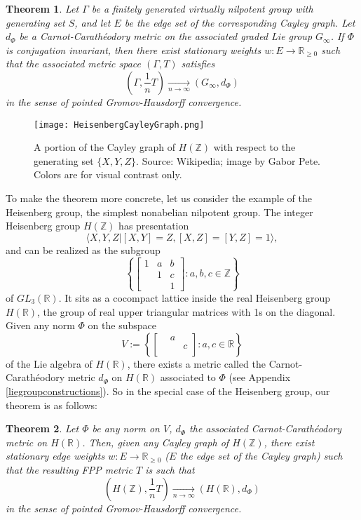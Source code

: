 \documentclass[12pt,reqno]{article}
\numberwithin{equation}{section}
\newcommand{\R}{\mathbb{R}}
\newcommand{\Z}{\mathbb{Z}}
\newcommand{\tendsto}[2]{\xrightarrow[#1 \to #2]{}}
\newtheorem{thm}{Theorem}
\begin{document}
\begin{thm} \label{mainthm}
Let $\Gamma$ be a finitely generated virtually nilpotent group with generating set $S$, and let $E$ be the edge set of the
corresponding Cayley graph. Let $d_{\Phi}$ be a Carnot-Carath\'eodory
metric on the associated graded Lie group $G_{\infty}$. If $\Phi$ is conjugation invariant, then there exist stationary weights
$w:E \to \R_{\ge 0}$ such that the associated metric space $(\Gamma, T)$ satisfies
\[ \left (\Gamma, \frac{1}{n}T \right) \tendsto{n}{\infty} (G_{\infty}, d_{\Phi}) \]
in the sense of pointed Gromov-Hausdorff convergence.
\end{thm}


\begin{figure}[t]
   \centering
   \texttt{[image: HeisenbergCayleyGraph.png]}
   \caption{A portion of the Cayley graph of $H(\Z)$ with respect to the generating set $\{X,Y,Z\}$. Source: Wikipedia; image by Gabor Pete.
   Colors are for visual contrast only.}
\end{figure}

 To make the theorem more concrete, let us consider the example of the Heisenberg group, the simplest nonabelian nilpotent group.
 The integer Heisenberg group $H(\Z)$ has presentation
 \[ \langle X, Y, Z | [X,Y]=Z, [X,Z]=[Y,Z]=1 \rangle, \]
 and can be realized as the subgroup
 \[ \left\{
    \begin{bmatrix}
    1 & a & b \\
       & 1 & c \\
       &    & 1
    \end{bmatrix}
    : a,b,c \in \Z 
    \right\}
 \]
 of $GL_3(\R)$. It sits as a cocompact lattice inside the real Heisenberg group $H(\R)$, the group of real upper triangular matrices
 with 1s on the diagonal. Given any norm $\Phi$ on the subspace
 \[ V := \left\{
    \begin{bmatrix}
      & a &   \\
      &    & c \\
      &    &
    \end{bmatrix}
    :
    a,c \in \R
    \right\}
 \]
 of the Lie algebra of $H(\R)$, there exists a metric called the Carnot-Carath\'eodory metric $d_{\Phi}$ on $H(\R)$ associated to $\Phi$
 (see Appendix \ref{liegroupconstructions}). So in the special case of the Heisenberg group, our theorem is as follows:
 \begin{thm}
 Let $\Phi$ be any norm on $V$, $d_{\Phi}$ the associated Carnot-Carath\'eodory metric on $H(\R)$. Then, given any Cayley graph
 of $H(\Z)$, there exist stationary edge weights $w:E \to \R_{\ge 0}$ ($E$ the edge set of the Cayley graph) such that the resulting
 FPP metric $T$ is such that
 \[ \left(H(\Z), \frac{1}{n}T\right) \tendsto{n}{\infty} (H(\R), d_{\Phi}) \]
in the sense of pointed Gromov-Hausdorff convergence.
 \end{thm}
 
\end{document}

